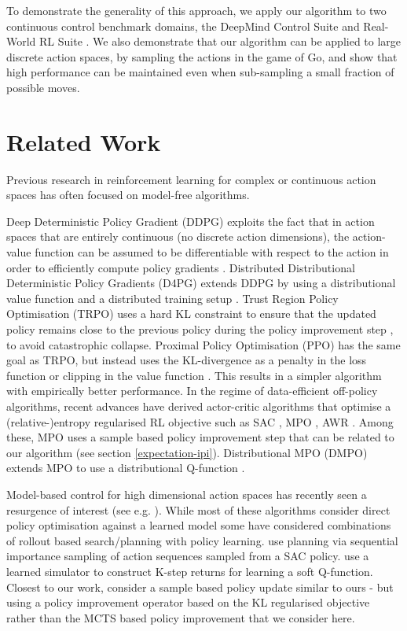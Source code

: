 \documentclass{article}
\newcommand{\dmcs}{DeepMind Control Suite }
\newcommand{\rwrl}{Real-World RL }
\begin{document}
To demonstrate the generality of this approach, we apply our algorithm to two continuous control benchmark domains, the \dmcs \cite{tassa2018deepmind} and \rwrl Suite \cite{dulacarnold2020empirical}. We also demonstrate that our algorithm can be applied to large discrete action spaces, by sampling the actions in the game of Go, and show that high performance can be maintained even when sub-sampling a small fraction of possible moves.


\section{Related Work}

Previous research in reinforcement learning for complex or continuous action spaces has often focused on model-free algorithms.

Deep Deterministic Policy Gradient (DDPG) exploits the fact that in action spaces that are entirely continuous (no discrete action dimensions), the action-value function  can be assumed to be differentiable with respect to the action  in order to efficiently compute policy gradients \cite{ddpg2014silver,lillicrap2015continuous}. Distributed Distributional Deterministic Policy Gradients (D4PG) extends DDPG by using a distributional value function and a distributed training setup \cite{d4pg}.
Trust Region Policy Optimisation (TRPO) uses a hard KL constraint to ensure that the updated policy remains close to the previous policy during the policy improvement step \cite{schulman2015trust}, to avoid catastrophic collapse.
Proximal Policy Optimisation (PPO) has the same goal as TRPO, but instead uses the KL-divergence as a penalty in the loss function or clipping in the value function \cite{schulman2017proximal}. This results in a simpler algorithm with empirically better performance.
In the regime of data-efficient off-policy algorithms, recent advances have derived actor-critic algorithms that optimise a (relative-)entropy regularised RL objective such as SAC \cite{haarnoja2018soft}, MPO \cite{mpo}, AWR \cite{peng2019advantage}. Among these, MPO uses a sample based policy improvement step that can be related to our algorithm (see section \ref{expectation-ipi}). Distributional MPO (DMPO) extends MPO to use a distributional Q-function \cite{hoffman2020acme}.

Model-based control for high dimensional action spaces has recently seen a resurgence of interest (see e.g. \cite{byravan2020imagined,hafner:planet,hafner2019dream, koul2020dream}). While most of these algorithms consider direct policy optimisation against a learned model some have considered combinations of rollout based search/planning with policy learning. \cite{piche2018probabilistic} use planning via sequential importance sampling of action sequences sampled from a SAC policy. \cite{bhardwaj2020information} use a learned simulator to construct K-step returns for learning a soft Q-function. Closest to our work, \cite{springenberg2020local} consider a sample based policy update similar to ours - but using a policy improvement operator based on the KL regularised objective rather than the MCTS based policy improvement that we consider here.
\end{document}
